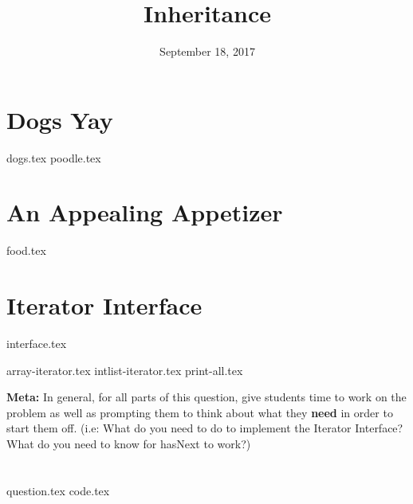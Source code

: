 \documentclass[11pt]{exam}
\title{Inheritance}
\date{September 18, 2017}
\begin{document}
\maketitle

\section{Dogs Yay}
\begin{questions}
{dogs.tex}
{poodle.tex}
\end{questions}

\clearpage

\section{An Appealing Appetizer}
\begin{questions}
{food.tex}
\end{questions}

\clearpage

\section{Iterator Interface}
{interface.tex}
\begin{questions}
{array-iterator.tex}
\clearpage
{intlist-iterator.tex}
{print-all.tex}
\begin{solution}[0.7in]
\begin{blocksection}
\textbf{Meta:} In general, for all parts of this question, give students time
to work on the problem as well as prompting them to think about what they
\textbf{need} in order to start them off. 
 (i.e: What do you need to do to implement the Iterator Interface?
  What do you need to know for hasNext to work?)
\end{blocksection}
\end{solution}
\end{questions}

\clearpage

\section{}
\begin{questions}
{question.tex}
{code.tex}
\end{questions}
\end{document}
